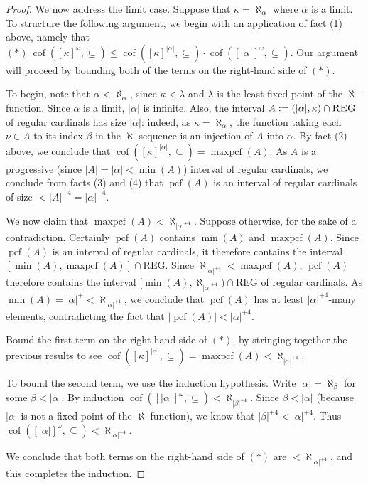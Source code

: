 \documentclass{article}
\DeclareMathOperator{\cof}{cof}
\begin{document}
\begin{proof}
We now address the limit case.
Suppose that $\kappa=\aleph_\alpha$ where $\alpha$ is a limit.
To structure the following argument, we begin with an application of fact (1) above, namely that 
$(\ast)\ \cof([\kappa]^\omega,\subseteq)\leq\cof([\kappa]^{|\alpha|},\subseteq)\cdot\cof([|\alpha|]^\omega,\subseteq)
$.
Our argument will proceed by bounding both of the terms on the right-hand side of $(\ast)$.

To begin, note that $\alpha<\aleph_\alpha$, since $\kappa<\lambda$ and $\lambda$ is the least fixed point of the $\aleph$-function.
Since $\alpha$ is a limit, $|\alpha|$ is infinite.
Also, the interval $A:=(|\alpha|,\kappa)\cap\textsc{REG}$ of regular cardinals has size $|\alpha|$: indeed, as $\kappa=\aleph_\alpha$, the function taking each $\nu\in A$ to its index $\beta$ in the $\aleph$-sequence is an injection of $A$ into $\alpha$.
By fact (2) above, we conclude that $\cof([\kappa]^{|\alpha|},\subseteq)=\operatorname{maxpcf}(A)$.
As $A$ is a progressive (since $|A|=|\alpha|<\min(A)$) interval of regular cardinals, we conclude from facts (3) and (4) that $\operatorname{pcf}(A)$ is an interval of regular cardinals of size $<|A|^{+4}=|\alpha|^{+4}$.

We now claim that $\operatorname{maxpcf}(A)<\aleph_{|\alpha|^{+4}}$.
Suppose otherwise, for the sake of a contradiction.
Certainly $\operatorname{pcf}(A)$ contains $\min(A)$ and $\operatorname{maxpcf}(A)$.
Since $\operatorname{pcf}(A)$ is an interval of regular cardinals, it therefore contains the interval $[\min(A),\operatorname{maxpcf}(A)]\cap\text{REG}$.
Since $\aleph_{|\alpha|^{+4}}<\operatorname{maxpcf}(A)$, $\operatorname{pcf}(A)$ therefore contains the interval $[\min(A),\aleph_{|\alpha|^{+4}})\cap\text{REG}$ of regular cardinals.
As $\min(A)=|\alpha|^+<\aleph_{|\alpha|^{+4}}$, we conclude that $\operatorname{pcf}(A)$ has at least $|\alpha|^{+4}$-many elements, contradicting the fact that $|\operatorname{pcf}(A)|<|\alpha|^{+4}$.

Bound the first term on the right-hand side of $(\ast)$, by stringing together the previous results to see 
$\cof([\kappa]^{|\alpha|},\subseteq)=\operatorname{maxpcf}(A)<\aleph_{|\alpha|^{+4}}$.

To bound the second term, we use the induction hypothesis.
Write $|\alpha|=\aleph_\beta$ for some $\beta<|\alpha|$. 
By induction $\cof([|\alpha|]^\omega,\subseteq)<\aleph_{|\beta|^{+4}}$.
Since $\beta<|\alpha|$ (because $|\alpha|$ is not a fixed point of the $\aleph$-function), we know that $|\beta|^{+4}<|\alpha|^{+4}$.
Thus $\cof([|\alpha|]^\omega,\subseteq)<\aleph_{|\alpha|^{+4}}$.

We  conclude that both terms on the right-hand side of $(\ast)$ are $<\aleph_{|\alpha|^{+4}}$, and this completes the induction.
\end{proof}
\end{document}
